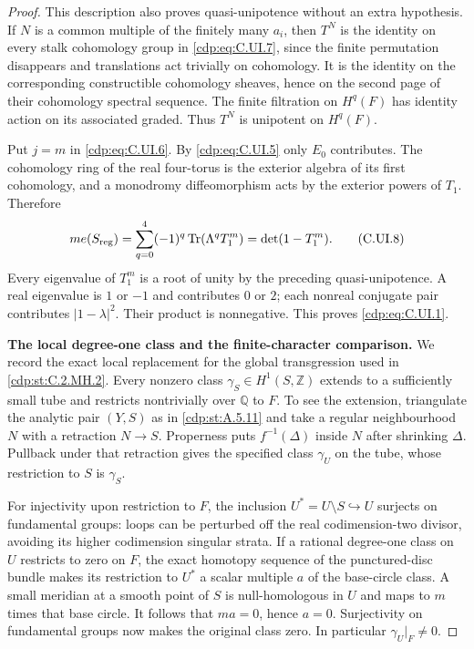 \begin{proof}
This description also proves quasi-unipotence without
an extra hypothesis. If $N$ is a common multiple of
the finitely many $a_i$, then $T^N$ is the identity
on every stalk cohomology group in \eqref{cdp:eq:C.UI.7}, since
the finite permutation disappears and translations
act trivially on cohomology. It is the identity on
the corresponding constructible cohomology sheaves,
hence on the second page of their cohomology spectral
sequence. The finite filtration on $H^q(F)$ has
identity action on its associated graded. Thus
$T^N$ is unipotent on $H^q(F)$.

Put $j=m$ in \eqref{cdp:eq:C.UI.6}. By \eqref{cdp:eq:C.UI.5} only $E_0$
contributes. The cohomology ring of the real
four-torus is the exterior algebra of its first
cohomology, and a monodromy diffeomorphism acts by
the exterior powers of $T_1$. Therefore
\[
 m e(S_{\rm reg})
   =\sum_{q=0}^4(-1)^q\operatorname{Tr}(\Lambda^qT_1^m)
   =\det(1-T_1^m).
 \tag{C.UI.8}\label{cdp:eq:C.UI.8}
\]
Every eigenvalue of $T_1^m$ is a root of unity by
the preceding quasi-unipotence. A real eigenvalue
is $1$ or $-1$ and contributes $0$ or $2$; each
nonreal conjugate pair contributes $|1-\lambda|^2$.
Their product is nonnegative. This proves \eqref{cdp:eq:C.UI.1}.

\par\medskip\noindent\textbf{The local degree-one class and the finite-character comparison.}\quad
We record the exact local replacement for the global
transgression used in \ref{cdp:st:C.2.MH.2}. Every nonzero class
$\gamma_S\in H^1(S,\mathbb Z)$ extends to a sufficiently
small tube and restricts nontrivially over $\mathbb Q$
to $F$. To see the extension, triangulate the analytic
pair $(Y,S)$ as in \ref{cdp:st:A.5.11} and take a regular
neighbourhood $N$ with a retraction $N\to S$.
Properness puts $f^{-1}(\Delta)$ inside $N$ after
shrinking $\Delta$. Pullback under that retraction
gives the specified class $\gamma_U$ on the tube,
whose restriction to $S$ is $\gamma_S$.

For injectivity upon restriction to $F$, the inclusion
$U^*=U\setminus S\hookrightarrow U$ surjects on
fundamental groups: loops can be perturbed off the
real codimension-two divisor, avoiding its higher
codimension singular strata. If a rational
degree-one class on $U$ restricts to zero on $F$,
the exact homotopy sequence of the punctured-disc
bundle makes its restriction to $U^*$ a scalar
multiple $a$ of the base-circle class. A small
meridian at a smooth point of $S$ is null-homologous
in $U$ and maps to $m$ times that base circle.
It follows that $ma=0$, hence $a=0$. Surjectivity
on fundamental groups now makes the original
class zero. In particular $\gamma_U|_F\ne0$.


\end{proof}
